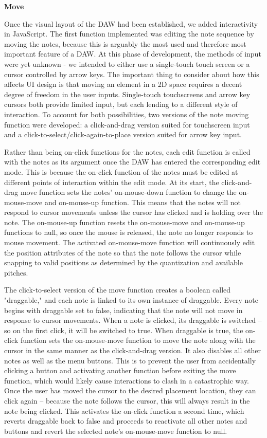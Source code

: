 \textbf{Move}

Once the visual layout of the DAW had been established, we added interactivity in JavaScript. The
first function implemented was editing the note sequence by moving the notes, because this is
arguably the most used and therefore most important feature of a DAW. At this phase of development,
the methods of input were yet unknown - we intended to either use a single-touch touch screen or a
cursor controlled by arrow keys. The important thing to consider about how this affects UI design
is that moving an element in a 2D space requires a decent degree of freedom in the user inputs.
Single-touch touchscreens and arrow key cursors both provide limited input, but each lending to a
different style of interaction. To account for both possibilities, two versions of the note moving
function were developed: a click-and-drag version suited for touchscreen input and a
click-to-select/click-again-to-place version suited for arrow key input.

Rather than being on-click functions for the notes, each edit function is called with the notes as
its argument once the DAW has entered the corresponding edit mode. This is because the on-click
function of the notes must be edited at different points of interaction within the edit mode. At
its start, the click-and-drag move function sets the notes' on-mouse-down function to change the
on-mouse-move and on-mouse-up function. This means that the notes will not respond to cursor
movements unless the cursor has clicked and is holding over the note. The on-mouse-up function
resets the on-mouse-move and on-mouse-up functions to null, so once the mouse is released, the note
no longer responds to mouse movement. The activated on-mouse-move function will continuously edit
the position attributes of the note so that the note follows the cursor while snapping to valid
positions as determined by the quantization and available pitches.

The click-to-select version of the move function creates a boolean called "draggable," and each
note is linked to its own instance of draggable. Every note begins with draggable set to false,
indicating that the note will not move in response to cursor movements. When a note is clicked, its
draggable is switched – so on the first click, it will be switched to true. When draggable is true,
the on-click function sets the on-mouse-move function to move the note along with the cursor in the
same manner as the click-and-drag version. It also disables all other notes as well as the menu
buttons. This is to prevent the user from accidentally clicking a button and activating another
function before exiting the move function, which would likely cause interactions to clash in a
catastrophic way. Once the user has moved the cursor to the desired placement location, they can
click again – because the note follows the cursor, this will always result in the note being
clicked. This activates the on-click function a second time, which reverts draggable back to false
and proceeds to reactivate all other notes and buttons and revert the selected note’s on-mouse-move
function to null.

